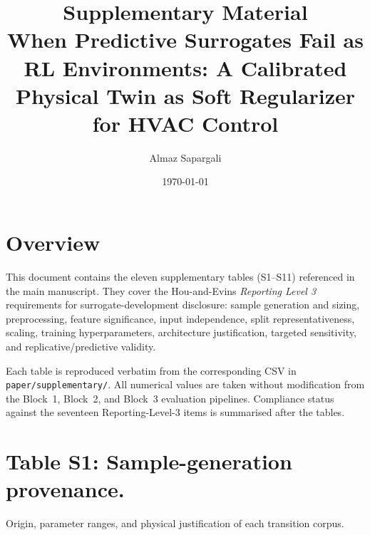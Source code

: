 \documentclass[11pt,a4paper]{article}
\title{Supplementary Material \\[0.3em]
       \large When Predictive Surrogates Fail as RL Environments:
       A Calibrated Physical Twin as Soft Regularizer for HVAC Control}
\author{Almaz Sapargali}
\date{\today}
\begin{document}
\maketitle

\section*{Overview}

This document contains the eleven supplementary tables (S1--S11)
referenced in the main manuscript. They cover the Hou-and-Evins
\emph{Reporting Level 3} requirements for surrogate-development
disclosure: sample generation and sizing, preprocessing, feature
significance, input independence, split representativeness, scaling,
training hyperparameters, architecture justification, targeted
sensitivity, and replicative/predictive validity.

Each table is reproduced verbatim from the corresponding CSV in
\texttt{paper/supplementary/}. All numerical values are taken without
modification from the Block~1, Block~2, and Block~3 evaluation
pipelines. Compliance status against the seventeen Reporting-Level-3
items is summarised after the tables.

\tableofcontents

\section*{Table S1:  Sample-generation provenance.}
Origin, parameter ranges, and physical justification of each transition corpus.
\end{document}
